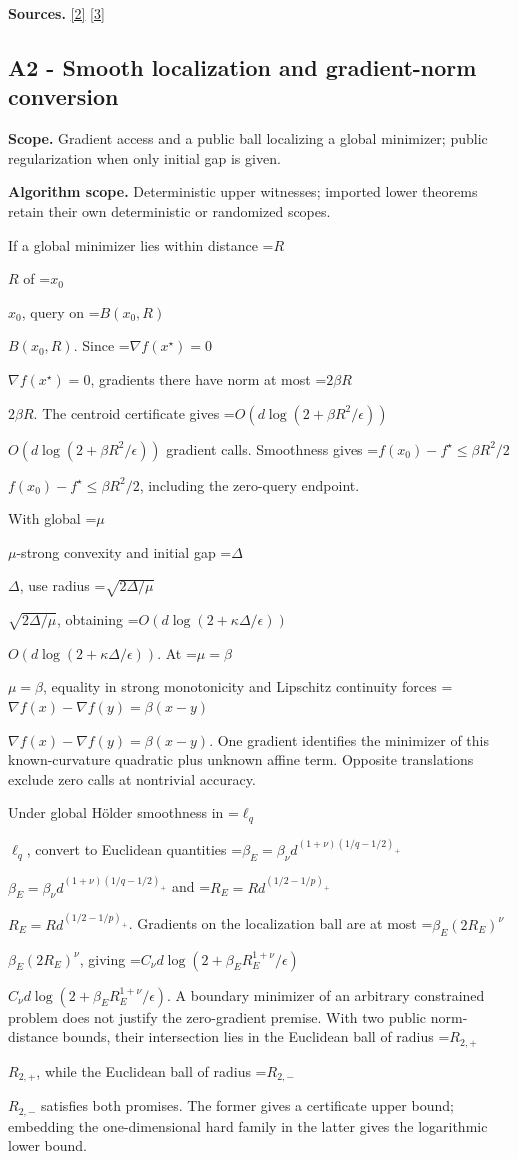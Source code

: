 \documentclass[10pt,a4paper]{article}
\newcommand{\AtlasMath}[1]{\par\begingroup\centering\setbox0=\hbox{$\displaystyle #1$}\ifdim\wd0>1.4\linewidth\typeout{ATLAS WIDE FORMULA: \the\wd0}\fi\ifdim\wd0>\linewidth\resizebox{\linewidth}{!}{\box0}\else\box0\fi\par\endgroup}
\newcommand{\AtlasInlineMath}[1]{\begingroup\setbox0=\hbox{$#1$}\ifdim\wd0>.4\linewidth\endgroup\AtlasMath{#1}\else\endgroup$#1$\fi}
\begin{document}
\textbf{Sources.} \href{https://proceedings.mlr.press/v97/zhou19b/zhou19b.pdf}{[2]} \href{https://arxiv.org/pdf/1405.4980}{[3]}

\subsection{A2 - Smooth localization and gradient-norm conversion}
\textbf{Scope.} Gradient access and a public ball localizing a global minimizer; public regularization when only initial gap is given.

\textbf{Algorithm scope.} Deterministic upper witnesses; imported lower theorems retain their own deterministic or randomized scopes.

If a global minimizer lies within distance \AtlasInlineMath{R} of \AtlasInlineMath{x_0}, query on \AtlasInlineMath{B(x_0,R)}. Since \AtlasInlineMath{\nabla f(x^\star)=0}, gradients there have norm at most \AtlasInlineMath{2\beta R}. The centroid certificate gives \AtlasInlineMath{O(d\log(2+\beta R^2/\epsilon))} gradient calls. Smoothness gives \AtlasInlineMath{f(x_0)-f^\star\le\beta R^2/2}, including the zero-query endpoint.

With global \AtlasInlineMath{\mu}-strong convexity and initial gap \AtlasInlineMath{\Delta}, use radius \AtlasInlineMath{\sqrt{2\Delta/\mu}}, obtaining \AtlasInlineMath{O(d\log(2+\kappa\Delta/\epsilon))}. At \AtlasInlineMath{\mu=\beta}, equality in strong monotonicity and Lipschitz continuity forces \AtlasInlineMath{\nabla f(x)-\nabla f(y)=\beta(x-y)}. One gradient identifies the minimizer of this known-curvature quadratic plus unknown affine term. Opposite translations exclude zero calls at nontrivial accuracy.

Under global Hölder smoothness in \AtlasInlineMath{\ell_q}, convert to Euclidean quantities
\AtlasInlineMath{\beta_E=\beta_\nu d^{(1+\nu)(1/q-1/2)_+}} and
\AtlasInlineMath{R_E=Rd^{(1/2-1/p)_+}}. Gradients on the localization ball are at most \AtlasInlineMath{\beta_E(2R_E)^\nu}, giving
\AtlasInlineMath{C_\nu d\log(2+\beta_E R_E^{1+\nu}/\epsilon)}.
A boundary minimizer of an arbitrary constrained problem does not justify the zero-gradient premise. With two public norm-distance bounds, their intersection lies in the Euclidean ball of radius \AtlasInlineMath{R_{2,+}}, while the Euclidean ball of radius \AtlasInlineMath{R_{2,-}} satisfies both promises. The former gives a certificate upper bound; embedding the one-dimensional hard family in the latter gives the logarithmic lower bound.
\end{document}

